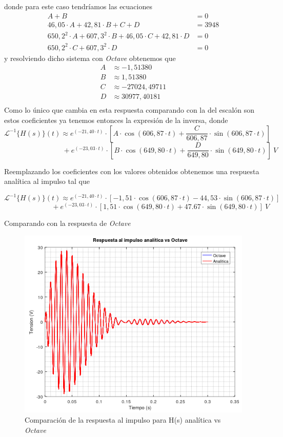 \documentclass[11pt,a4paper]{report}
\begin{document}
\bigskip
donde para este caso tendríamos las ecuaciones
\begin{align*}
A+B&=0 \\
46,05 \cdot A +42,81 \cdot B + C + D &= 3948 \\
650,2^2 \cdot A + 607,3^2 \cdot B + 46,05 \cdot C + 42,81 \cdot D &= 0 \\
650,2^2 \cdot C + 607,3^2 \cdot D &= 0
\end{align*}
y resolviendo dicho sistema con \textit{Octave} obtenemos que
\begin{align*}
A &\approx -1,51380 \\
B &\approx 1,51380 \\
C &\approx -27024,49711 \\
D &\approx 30977,40181 \\
\end{align*}
Como lo único que cambia en esta respuesta comparando con la del escalón son estos coeficientes ya tenemos entonces la expresión de la inversa, donde
\[\mathcal{L}^{-1}\{H(s)\}(t) \approx e^{(-21,40 \cdot t)} \cdot [A \cdot \cos(606,87 \cdot t) + \frac{C}{606,87} \cdot \sin(606,87 \cdot t)]\] 
\[\phantom{asadsdasdasdasda} + e^{(-23,03 \cdot t)} \cdot [B \cdot \cos(649,80 \cdot t) + \frac{D}{649,80} \cdot \sin(649,80 \cdot t)] \ V\]

\bigskip
Reemplazando los coeficientes con los valores obtenidos obtenemos una respuesta analítica al impulso tal que

\[\mathcal{L}^{-1}\{H(s)\}(t) \approx e^{(-21,40 \cdot t)} \cdot [-1,51 \cdot \cos(606,87 \cdot t) -44,53 \cdot \sin(606,87 \cdot t)]\] 
\[\phantom{asadsdasdasda} + e^{(-23,03 \cdot t)} \cdot [1,51 \cdot \cos(649,80 \cdot t) + 47.67 \cdot \sin(649,80 \cdot t)] \ V\]

Comparando con la respuesta de \textit{Octave}

\begin{figure}[h!]
\centering
\includegraphics[scale=1]{rtaImpulsoAnaliticavsOctave.png}
\caption{Comparación de la respuesta al impulso para H(s) analítica vs \textit{Octave}}
\end{figure}
\end{document}

